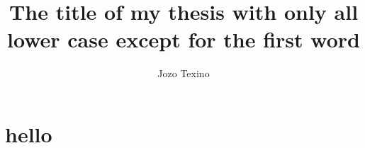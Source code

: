 \documentclass[gpscopy,onehalfspacing,11pt]{ubcdiss}
\title{The title of my thesis with only all lower case except for the first word}
\author{Jozo Texino}
\begin{document}

%
%

	\maketitle

	
	\cleardoublepage

	
	\cleardoublepage

	\tableofcontents
	\cleardoublepage	%

	\listoftables
	\cleardoublepage	%

	\listoffigures
	\cleardoublepage	%


	

	\textspacing		%

	


	\mainmatter

	\acresetall	%
	
	\chapter{hello}
	\citet{lamport-1994-ladps}
	
\end{document}
